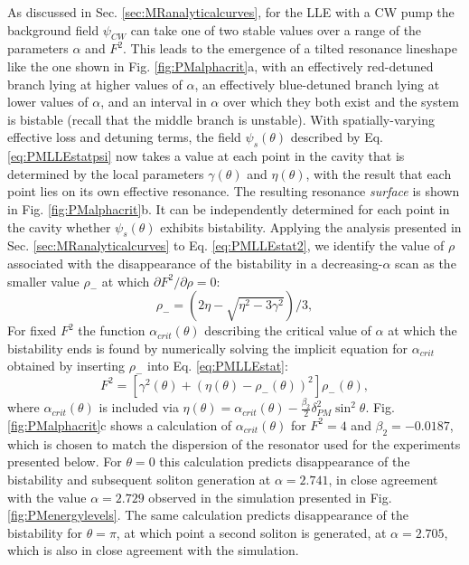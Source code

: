 As discussed in Sec. \ref{sec:MRanalyticalcurves}, for the LLE with a CW pump the background field $\psi_{CW}$ can take one of two stable values over a range of the parameters $\alpha$ and $F^2$. This leads to the emergence of a tilted resonance lineshape like the one shown in Fig. \ref{fig:PMalphacrit}a, with an effectively red-detuned branch lying at higher values of $\alpha$, an effectively blue-detuned branch lying at lower values of $\alpha$, and an interval in $\alpha$ over which they both exist and the system is bistable (recall that the middle branch is unstable). With spatially-varying effective loss and detuning terms, the field $\psi_s(\theta)$ described by Eq. \ref{eq:PMLLEstatpsi} now takes a value at each point in the cavity that is determined by the local parameters $\gamma(\theta)$ and $\eta(\theta)$, with the result that each point lies on its own effective resonance. The resulting resonance \textit{surface} is shown in Fig. \ref{fig:PMalphacrit}b. It can be independently determined for each point in the cavity whether $\psi_s(\theta)$ exhibits bistability. Applying the analysis presented in Sec. \ref{sec:MRanalyticalcurves} to Eq. \ref{eq:PMLLEstat2}, we identify the value of $\rho$ associated with the disappearance of the bistability in a decreasing-$\alpha$ scan as the smaller value $\rho_-$ at which $\partial F^2/\partial\rho=0$:
\begin{equation}
\rho_-=\left(2\eta-\sqrt{\eta^2-3\gamma^2}\right)/3,
\end{equation}
For fixed $F^2$ the function $\alpha_{crit}(\theta)$ describing the critical value of $\alpha$ at which the bistability ends is found by numerically solving the implicit equation for $\alpha_{crit}$ obtained by inserting $\rho_-$ into Eq. \ref{eq:PMLLEstat}:
\begin{equation}
F^2=\left[\gamma^2(\theta)+\left(\eta(\theta)-\rho_-(\theta)\right)^2\right]\rho_-(\theta),
\end{equation}
where $\alpha_{crit}(\theta)$ is included via $\eta(\theta)=\alpha_{crit}(\theta)-\frac{\beta_2}{2}\delta_{PM}^2\sin^2{\theta}$. Fig. \ref{fig:PMalphacrit}c shows a calculation of $\alpha_{crit}(\theta)$ for $F^2=4$ and $\beta_2=-0.0187$, which is chosen to match the dispersion of the resonator used for the experiments presented below. For $\theta=0$ this calculation predicts disappearance of the bistability and subsequent soliton generation at $\alpha=2.741$, in close agreement with the value $\alpha=2.729$ observed in the simulation presented in Fig. \ref{fig:PMenergylevels}. The same calculation predicts disappearance of the bistability for $\theta=\pi$, at which point a second soliton is generated, at $\alpha=2.705$, which is also in close agreement with the simulation.



